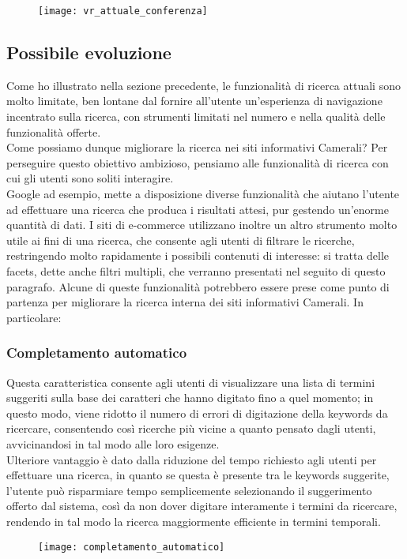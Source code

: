 		\begin{figure}[htbp]
			\label{img:conferenza}
			\begin{center}
				\texttt{[image: vr\_attuale\_conferenza]}
			\end{center}
		\end{figure}
		
		\newpage
		\subsection{Possibile evoluzione}
		\label{sub:possibile_evoluzione}
		Come ho illustrato nella sezione precedente, le funzionalità di ricerca attuali sono molto limitate, ben lontane dal fornire all'utente un'esperienza di navigazione incentrato sulla ricerca, con strumenti limitati nel numero e nella qualità delle funzionalità offerte. \\
		Come possiamo dunque migliorare la ricerca nei siti informativi Camerali?
		Per perseguire questo obiettivo ambizioso, pensiamo alle funzionalità di ricerca con cui gli utenti sono soliti interagire. \\		
		Google ad esempio, mette a disposizione diverse funzionalità che aiutano l’utente ad effettuare una ricerca che produca i risultati attesi, pur gestendo un'enorme quantità di dati. I siti di e-commerce utilizzano inoltre un altro strumento molto utile ai fini di una ricerca, che consente agli utenti di filtrare le ricerche, restringendo molto rapidamente i possibili contenuti di interesse: si tratta delle facets, dette anche filtri multipli, che verranno presentati nel seguito di questo paragrafo. Alcune di queste funzionalità potrebbero essere prese come punto di partenza per migliorare la ricerca interna dei siti informativi Camerali. In particolare:
		
			\subsubsection{Completamento automatico}
			Questa caratteristica consente agli utenti di visualizzare una lista di termini suggeriti sulla base dei caratteri che hanno digitato fino a quel momento; in questo modo, viene ridotto il numero di errori di digitazione della keywords da ricercare, consentendo così ricerche più vicine a quanto pensato dagli utenti, avvicinandosi in tal modo alle loro esigenze. \\ Ulteriore vantaggio è dato dalla riduzione del tempo richiesto agli utenti per effettuare una ricerca, in quanto se questa è presente tra le keywords suggerite, l'utente può risparmiare tempo semplicemente selezionando il suggerimento offerto dal sistema, così da non dover digitare interamente i termini da ricercare, rendendo in tal modo la ricerca maggiormente efficiente in termini temporali.
			\begin{figure}[htbp]
				\begin{center}
					\texttt{[image: completamento\_automatico]}
				\end{center}
			\end{figure}
		
